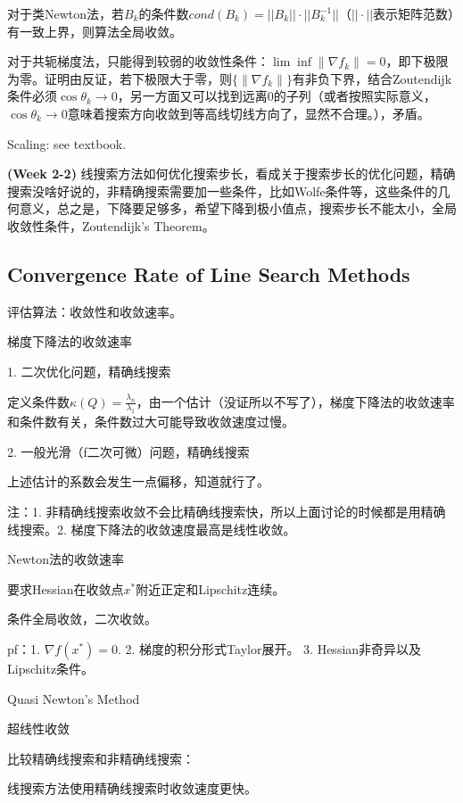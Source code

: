 对于类Newton法，若$B_k$的条件数$cond(B_k) = ||B_k|| \cdot ||B_k^{-1}||$（$||\cdot||$表示矩阵范数）有一致上界，则算法全局收敛。

对于共轭梯度法，只能得到较弱的收敛性条件：$\lim \inf \left\|\nabla f_{k}\right\| = 0$，即下极限为零。证明由反证，若下极限大于零，则$\{\left\|\nabla f_{k}\right\|\}$有非负下界，结合Zoutendijk条件必须$\cos \theta_k \to 0$，另一方面又可以找到远离0的子列（或者按照实际意义，$\cos \theta_k \to 0$意味着搜索方向收敛到等高线切线方向了，显然不合理。），矛盾。

Scaling: see textbook.

\begin{conc}
  \textbf{(Week 2-2)} 线搜索方法如何优化搜索步长，看成关于搜索步长的优化问题，精确搜索没啥好说的，非精确搜索需要加一些条件，比如Wolfe条件等，这些条件的几何意义，总之是，下降要足够多，希望下降到极小值点，搜索步长不能太小，全局收敛性条件，Zoutendijk's Theorem。
\end{conc}

\subsection{Convergence Rate of Line Search Methods}

评估算法：收敛性和收敛速率。

梯度下降法的收敛速率

1. 二次优化问题，精确线搜索

定义条件数$\kappa(Q) = \frac{\lambda_n}{\lambda_1}$，由一个估计（没证所以不写了），梯度下降法的收敛速率和条件数有关，条件数过大可能导致收敛速度过慢。

2. 一般光滑（f二次可微）问题，精确线搜索

上述估计的系数会发生一点偏移，知道就行了。

注：1. 非精确线搜索收敛不会比精确线搜索快，所以上面讨论的时候都是用精确线搜索。2. 梯度下降法的收敛速度最高是线性收敛。

Newton法的收敛速率

要求Hessian在收敛点$x^{\ast}$附近正定和Lipschitz连续。

条件全局收敛，二次收敛。

pf：1. $\nabla f(x^{\ast}) = 0$. 2. 梯度的积分形式Taylor展开。 3. Hessian非奇异以及Lipschitz条件。

Quasi Newton's Method

超线性收敛

比较精确线搜索和非精确线搜索：

线搜索方法使用精确线搜索时收敛速度更快。

